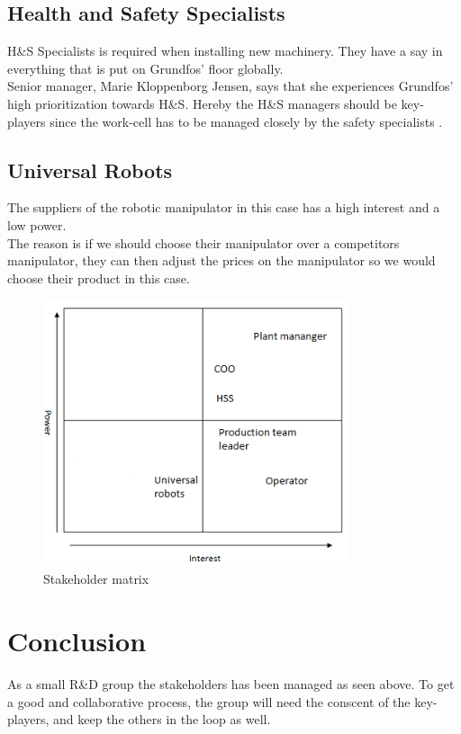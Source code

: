 \subsection{Health and Safety Specialists}\label{ch:SafetyPersonel}

H\&S Specialists is required when installing new machinery. They have a say in everything that is put on Grundfos' floor globally.\\
Senior manager, Marie Kloppenborg Jensen, says that she experiences Grundfos' high prioritization towards H\&S. Hereby the H\&S managers should be key-players since the work-cell has to be managed closely by the safety specialists \cite{H&S}.\\

\subsection{Universal Robots}\label{ch:Universalrobots-stake}
The suppliers of the robotic manipulator in this case has a high interest and a low power.\\The reason is if we should choose their manipulator over a competitors manipulator, they can then adjust the prices on the manipulator so we would choose their product in this case. \\

\begin{figure}[h]
    \centering
     \includegraphics[width=9cm]{StakeholderAnalysis/matrix.PNG}
    \caption{Stakeholder matrix}
    \label{fig:Stackholder matrix}
\end{figure}

\section{Conclusion}
As a small R\&D group the stakeholders has been managed as seen above. To get a good and collaborative process, the group will need the conscent of the key-players, and keep the others in the loop as well. 

